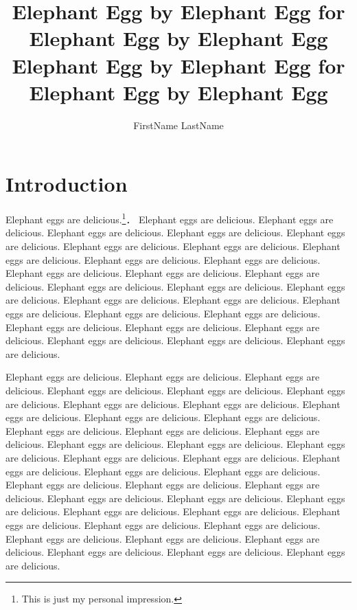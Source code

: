 \documentclass[
  10pt,      %
  a4j,       %
  twocolumn, %
  english,   %
  uplatex,
  dvipdfmx
]{jsarticle}
\title{Elephant Egg by Elephant Egg for Elephant Egg by Elephant Egg \linebreak Elephant Egg by Elephant Egg for Elephant Egg by Elephant Egg}
\author{FirstName LastName}
\begin{document}
\maketitle

\section{Introduction}
\label{sec:introduction}
Elephant eggs are delicious.\footnote{This is just my personal impression.}． Elephant eggs are delicious. Elephant eggs are delicious. Elephant eggs are delicious. Elephant eggs are delicious. Elephant eggs are delicious. Elephant eggs are delicious. Elephant eggs are delicious. Elephant eggs are delicious. Elephant eggs are delicious. Elephant eggs are delicious. Elephant eggs are delicious. Elephant eggs are delicious. Elephant eggs are delicious. Elephant eggs are delicious. Elephant eggs are delicious. Elephant eggs are delicious. Elephant eggs are delicious. Elephant eggs are delicious. Elephant eggs are delicious. Elephant eggs are delicious. Elephant eggs are delicious. Elephant eggs are delicious. Elephant eggs are delicious. Elephant eggs are delicious. Elephant eggs are delicious. Elephant eggs are delicious. Elephant eggs are delicious.

Elephant eggs are delicious. Elephant eggs are delicious. Elephant eggs are delicious. Elephant eggs are delicious. Elephant eggs are delicious. Elephant eggs are delicious. Elephant eggs are delicious. Elephant eggs are delicious. Elephant eggs are delicious. Elephant eggs are delicious. Elephant eggs are delicious. Elephant eggs are delicious. Elephant eggs are delicious. Elephant eggs are delicious. Elephant eggs are delicious. Elephant eggs are delicious. Elephant eggs are delicious. Elephant eggs are delicious. Elephant eggs are delicious. Elephant eggs are delicious. Elephant eggs are delicious. Elephant eggs are delicious. Elephant eggs are delicious. Elephant eggs are delicious. Elephant eggs are delicious. Elephant eggs are delicious. Elephant eggs are delicious. Elephant eggs are delicious. Elephant eggs are delicious. Elephant eggs are delicious. Elephant eggs are delicious. Elephant eggs are delicious. Elephant eggs are delicious. Elephant eggs are delicious. Elephant eggs are delicious. Elephant eggs are delicious. Elephant eggs are delicious. Elephant eggs are delicious. Elephant eggs are delicious.
\end{document}
